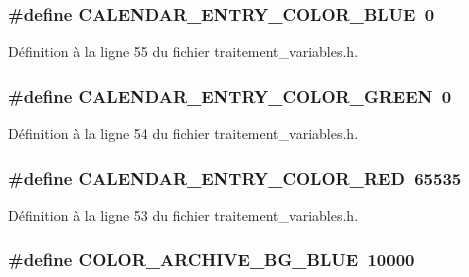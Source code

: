 \subsubsection[{CALENDAR\_\-ENTRY\_\-COLOR\_\-BLUE}]{\setlength{\rightskip}{0pt plus 5cm}\#define CALENDAR\_\-ENTRY\_\-COLOR\_\-BLUE~0}\label{traitement__variables_8h_ac1fee70d23481665fb95716bba766763}


Définition à la ligne 55 du fichier traitement\_\-variables.h.

\subsubsection[{CALENDAR\_\-ENTRY\_\-COLOR\_\-GREEN}]{\setlength{\rightskip}{0pt plus 5cm}\#define CALENDAR\_\-ENTRY\_\-COLOR\_\-GREEN~0}\label{traitement__variables_8h_a56e8b056862f54403dfa684acc9ac7d2}


Définition à la ligne 54 du fichier traitement\_\-variables.h.

\subsubsection[{CALENDAR\_\-ENTRY\_\-COLOR\_\-RED}]{\setlength{\rightskip}{0pt plus 5cm}\#define CALENDAR\_\-ENTRY\_\-COLOR\_\-RED~65535}\label{traitement__variables_8h_aef3af53f203fe9cc4e04ac0da1b27837}


Définition à la ligne 53 du fichier traitement\_\-variables.h.

\subsubsection[{COLOR\_\-ARCHIVE\_\-BG\_\-BLUE}]{\setlength{\rightskip}{0pt plus 5cm}\#define COLOR\_\-ARCHIVE\_\-BG\_\-BLUE~10000}\label{traitement__variables_8h_a3a6fbd0c0e4c83bd5c687921b98ae4b4}


